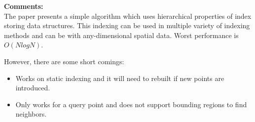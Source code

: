 \documentclass[a4paper,12pt, twoside]{article}
\begin{document}
\textbf{Comments:}\\
The paper presents a simple algorithm which uses hierarchical properties of index storing data structures. This indexing can be used in multiple variety of indexing methods and can be with any-dimensional spatial data. Worst performance is $O(NlogN)$.

However, there are some short comings:
\begin{itemize}
	\item Works on static indexing and it will need to rebuilt if new points are introduced.
	
	\item Only works for a query point and does not support bounding regions to find neighbors.

\end{itemize}
\end{document}
